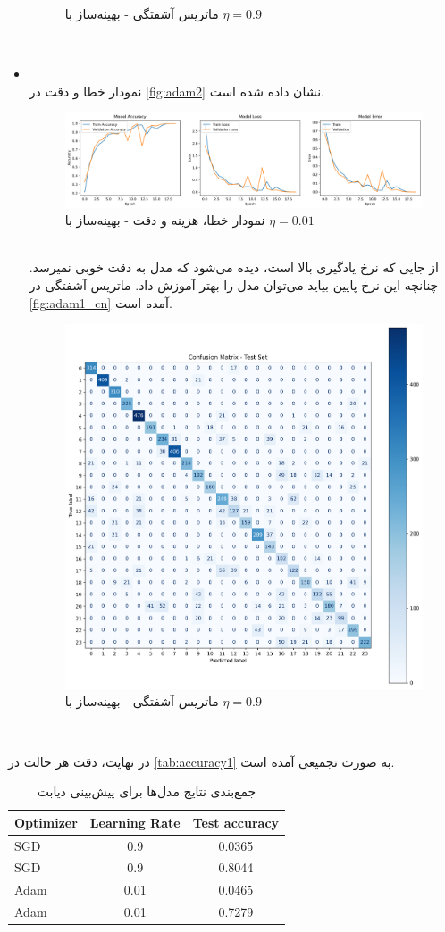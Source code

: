 \documentclass[11pt]{article}
\begin{document}
\begin{itemize}
\begin{figure}[!h]
		\caption{ماتریس آشفتگی - بهینه‌ساز  با $\eta=0.9$}
		\label{fig:adam1_cm}
	\end{figure}\\
	\pagebreak
			\item {}\\
	نمودار خطا و دقت در 
	\autoref{fig:adam2}
	نشان داده شده است.
	\begin{figure}[!h]
		\centerline{\includegraphics[width=1\linewidth]{../HW3_1/adam2.png}}
		\caption{نمودار خطا، هزینه و دقت - بهینه‌ساز  با $\eta=0.01$}
		\label{fig:adam2}
	\end{figure}\\
	از جایی که نرخ یادگیری بالا است، دیده می‌شود که مدل به دقت خوبی نمیرسد. چنانچه این نرخ پایین بیاید می‌توان مدل را بهتر آموزش داد. ماتریس آشفتگی در
	\autoref{fig:adam1_cn}
	آمده است.
	\begin{figure}[!h]
		\centerline{\includegraphics[width=0.5\linewidth]{../HW3_1/adam2 cm.png}}
		\caption{ماتریس آشفتگی - بهینه‌ساز  با $\eta=0.9$}
		\label{fig:sgdcm}
	\end{figure}\\
	\pagebreak
	\end{itemize}
	در نهایت، دقت هر حالت در 
	\autoref{tab:accuracy1}
	به صورت تجمیعی آمده است.
	\begin{table}[h!]
		\caption{جمع‌بندی نتایج مدل‌ها برای پیش‌بینی دیابت}
		\begin{latin}
			\centering
			\begin{tabular}{|l|c|c|}
				\hline
				\textbf{Optimizer} & \textbf{Learning Rate} & \textbf{Test accuracy} \\ \hline
				SGD & 0.9 & 0.0365 \\ \hline
				SGD & 0.9 & 0.8044 \\ \hline
				Adam & 0.01 &  0.0465 \\ \hline
				Adam & 0.01 & 0.7279 \\ \hline
			\end{tabular}
		\end{latin}
		\label{tab:accuracy1} 
	\end{table}\\
\end{document}
